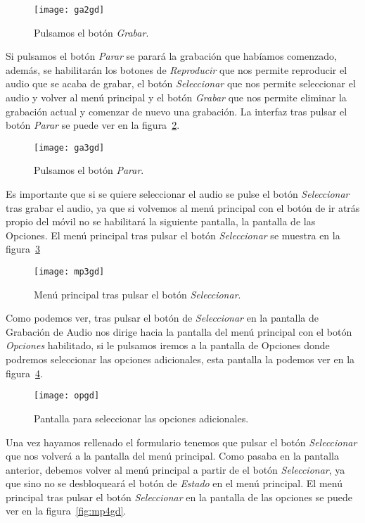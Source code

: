 \begin{figure}[H]
	\centering
	\texttt{[image: ga2gd]}
	\caption{Pulsamos el botón \textit{Grabar}.}
	\label{fig:ga2gd}
\end{figure}

Si pulsamos el botón \textit{Parar} se parará la grabación que habíamos comenzado, además, se habilitarán los botones de \textit{Reproducir} que nos permite reproducir el audio que se acaba de grabar, el botón \textit{Seleccionar} que nos permite seleccionar el audio y volver al menú principal y el botón \textit{Grabar} que nos permite eliminar la grabación actual y comenzar de nuevo una grabación. La interfaz tras pulsar el botón \textit{Parar} se puede ver en la figura~\ref{fig:ga3gd}.

\begin{figure}[H]
	\centering
	\texttt{[image: ga3gd]}
	\caption{Pulsamos el botón \textit{Parar}.}
	\label{fig:ga3gd}
\end{figure}

Es importante que si se quiere seleccionar el audio se pulse el botón \textit{Seleccionar} tras grabar el audio, ya que si volvemos al menú principal con el botón de ir atrás propio del móvil no se habilitará la siguiente pantalla, la pantalla de las Opciones. El menú principal tras pulsar el botón \textit{Seleccionar} se muestra en la figura~\ref{fig:mp3gd}

\begin{figure}[H]
	\centering
	\texttt{[image: mp3gd]}
	\caption{Menú principal tras pulsar el botón \textit{Seleccionar}.}
	\label{fig:mp3gd}
\end{figure}

Como podemos ver, tras pulsar el botón de \textit{Seleccionar} en la pantalla de Grabación de Audio nos dirige hacia la pantalla del menú principal con el botón \textit{Opciones} habilitado, si le pulsamos iremos a la pantalla de Opciones donde podremos seleccionar las opciones adicionales, esta pantalla la podemos ver en la figura~\ref{fig:opgd}.

\begin{figure}[H]
	\centering
	\texttt{[image: opgd]}
	\caption{Pantalla para seleccionar las opciones adicionales.}
	\label{fig:opgd}
\end{figure}

Una vez hayamos rellenado el formulario tenemos que pulsar el botón \textit{Seleccionar} que nos volverá a la pantalla del menú principal. Como pasaba en la pantalla anterior, debemos volver al menú principal a partir de el botón \textit{Seleccionar}, ya que sino no se desbloqueará el botón de \textit{Estado} en el menú principal. El menú principal tras pulsar el botón \textit{Seleccionar} en la pantalla de las opciones se puede ver en la figura~\ref{fig:mp4gd}.

